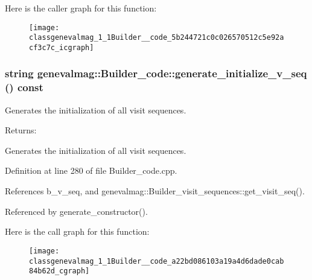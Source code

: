 Here is the caller graph for this function:\nopagebreak
\begin{figure}[H]
\begin{center}
\leavevmode
\texttt{[image: classgenevalmag\_1\_1Builder\_\_code\_5b244721c0c026570512c5e92acf3c7c\_icgraph]}
\end{center}
\end{figure}
\hypertarget{classgenevalmag_1_1Builder__code_a22bd086103a19a4d6dade0cab84b62d}{
\subsubsection[{generate\_\-initialize\_\-v\_\-seq}]{\setlength{\rightskip}{0pt plus 5cm}string genevalmag::Builder\_\-code::generate\_\-initialize\_\-v\_\-seq () const}}
\label{classgenevalmag_1_1Builder__code_a22bd086103a19a4d6dade0cab84b62d}


Generates the initialization of all visit sequences. \begin{Desc}
\item[Returns:]\end{Desc}
Generates the initialization of all visit sequences. 

Definition at line 280 of file Builder\_\-code.cpp.

References b\_\-v\_\-seq, and genevalmag::Builder\_\-visit\_\-sequences::get\_\-visit\_\-seq().

Referenced by generate\_\-constructor().

Here is the call graph for this function:\nopagebreak
\begin{figure}[H]
\begin{center}
\leavevmode
\texttt{[image: classgenevalmag\_1\_1Builder\_\_code\_a22bd086103a19a4d6dade0cab84b62d\_cgraph]}
\end{center}
\end{figure}


